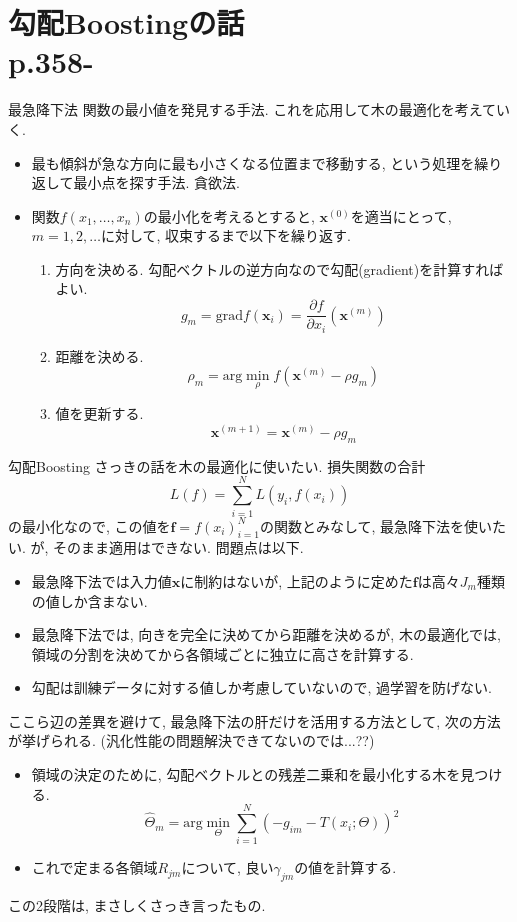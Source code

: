 \documentclass[dvipdfmx,8pt]{beamer}
\begin{document}
  \section{勾配Boostingの話\\p.358-}
  \begin{frame}{最急降下法}
    関数の最小値を発見する手法. これを応用して木の最適化を考えていく.
    \begin{itemize}
      \item 最も傾斜が急な方向に最も小さくなる位置まで移動する, という処理を繰り返して最小点を探す手法. 貪欲法.
      \item 関数$f(x_1,\dots,x_n)$の最小化を考えるとすると, $\textbf{x}^{(0)}$を適当にとって, $m=1,2,\dots$に対して, 収束するまで以下を繰り返す.
      \begin{enumerate}
        \item 方向を決める. 勾配ベクトルの逆方向なので勾配(gradient)を計算すればよい.         \[
          g_m=\mathrm{grad}f(\textbf{x}_i)=\frac{\partial f}{\partial x_i}(\textbf{x}^{(m)})
        \]
        \item 距離を決める.
        \[
          \rho_m=\mathrm{arg}\min_{\rho}f(\textbf{x}^{(m)}-\rho g_m)
        \]
        \item 値を更新する.
        \[
          \textbf{x}^{(m+1)}=\textbf{x}^{(m)}-\rho g_m
        \]
      \end{enumerate}
    \end{itemize}
  \end{frame}
  \begin{frame}{勾配Boosting}
    さっきの話を木の最適化に使いたい. 損失関数の合計
    \[
      L(f)=\sum_{i=1}^{N}L(y_i,f(x_i))
    \]
    の最小化なので, この値を$\textbf{f}={f(x_i)}_{i=1}^{N}$の関数とみなして, 最急降下法を使いたい. が, そのまま適用はできない. 問題点は以下.
    \begin{itemize}
      \item 最急降下法では入力値$\textbf{x}$に制約はないが, 上記のように定めた$\textbf{f}$は高々$J_m$種類の値しか含まない.
      \item 最急降下法では, 向きを完全に決めてから距離を決めるが, 木の最適化では, 領域の分割を決めてから各領域ごとに独立に高さを計算する.
      \item 勾配は訓練データに対する値しか考慮していないので, 過学習を防げない.
    \end{itemize}
    ここら辺の差異を避けて, 最急降下法の肝だけを活用する方法として, 次の方法が挙げられる. (汎化性能の問題解決できてないのでは...??)
    \begin{itemize}
      \item 領域の決定のために, 勾配ベクトルとの残差二乗和を最小化する木を見つける.
      \[
        \hat{\Theta}_m=\mathrm{arg}\min_{\Theta}\sum_{i=1}^{N}(-g_{im}-T(x_i;\Theta))^2
      \]
      \item これで定まる各領域$R_{jm}$について, 良い$\gamma_{jm}$の値を計算する.
    \end{itemize}
    この2段階は, まさしくさっき言ったもの.
  \end{frame}
\end{document}
